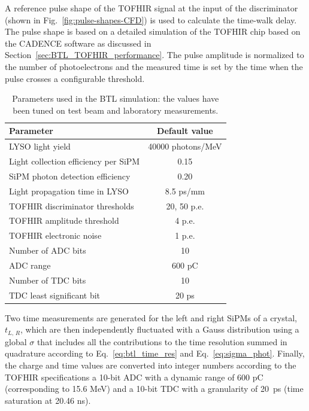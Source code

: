 A reference pulse shape of the TOFHIR signal at the input of the
discriminator (shown in Fig.~\ref{fig:pulse-shapes-CFD}) is used to
calculate the time-walk delay. The pulse shape is based on a detailed
simulation of the TOFHIR chip based on the CADENCE software as
discussed in Section~\ref{sec:BTL_TOFHIR_performance}.  The pulse
amplitude is normalized to the number of photoelectrons 
and the measured time is set by the time when the pulse crosses a
configurable threshold. 

\begin{table}
  \begin{center}  
    \begin{tabular}{ l | c }
      \hline
      Parameter & Default value \\
      \hline
      LYSO light yield                     & 40000 photons/MeV \\
      Light collection efficiency per SiPM & 0.15  \\ 
      SiPM photon detection efficiency     & 0.20  \\
      Light propagation time in LYSO       & 8.5 ps/mm \\
      \hline
      TOFHIR discriminator thresholds      & 20, 50 p.e. \\
      TOFHIR amplitude threshold           & 4 p.e. \\
      TOFHIR electronic noise              & 1 p.e. \\ 
      Number of ADC bits                   & 10 \\
      ADC range                            & 600 pC \\  
      Number of TDC bits                   & 10 \\
      TDC least significant bit            & 20 ps \\
    \hline
    \end{tabular}
    \caption{Parameters used in the BTL simulation: the values have been tuned on test beam and laboratory measurements.
    \label{tab:sim_parameters}}
  \end{center}
\end{table}

Two time measurements are generated for the left and right SiPMs of a
crystal, $t_{L,\,R}$, which are then independently fluctuated with a
Gauss distribution using a global $\sigma$ that includes all the 
contributions to the time resolution summed in quadrature according to
Eq.~\ref{eq:btl_time_res} and Eq.~\ref{eq:sigma_phot}. 
Finally, the charge and time values are converted into integer numbers according to the TOFHIR specifications 
a 10-bit ADC with a dynamic range of 600 pC (corresponding to 15.6 MeV) and a 10-bit TDC with a granularity of 20~ps
(time saturation at 20.46 ns).

